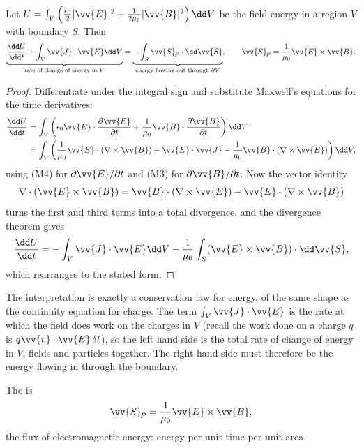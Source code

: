\begin{theorem}
	Let $U = \int_V\left(\frac{\epsilon_0}{2}|\vv{E}|^2 + \frac{1}{2\mu_0}|\vv{B}|^2\right)\dd V$ be the field energy in a region $V$ with boundary $S$. Then
	$$
	\underbrace{\frac{\dd U}{\dd t} + \int_V \vv{J}\cdot\vv{E}\dd V}_{\text{rate of change of energy in } V} = \underbrace{-\int_S \vv{S}_{\!P}\cdot\dd\vv{S}}_{\text{energy flowing out through }\partial V}, \qquad \vv{S}_{\!P} = \frac{1}{\mu_0}\vv{E}\times\vv{B}.
	$$
\end{theorem}
\begin{proof}
	Differentiate under the integral sign and substitute Maxwell's equations for the time derivatives:
	\begin{align*}
		\frac{\dd U}{\dd t} &= \int_V \left(\epsilon_0 \vv{E}\cdot\frac{\partial \vv{E}}{\partial t} + \frac{1}{\mu_0}\vv{B}\cdot\frac{\partial\vv{B}}{\partial t}\right)\dd V\\
		&= \int_V\left(\frac{1}{\mu_0}\vv{E}\cdot(\nabla\times\vv{B}) - \vv{E}\cdot\vv{J} - \frac{1}{\mu_0}\vv{B}\cdot(\nabla\times\vv{E})\right)\dd V,
	\end{align*}
	using (M4) for $\partial\vv{E}/\partial t$ and (M3) for $\partial\vv{B}/\partial t$. Now the vector identity
	$$
	\nabla\cdot(\vv{E}\times\vv{B}) = \vv{B}\cdot(\nabla\times\vv{E}) - \vv{E}\cdot(\nabla\times\vv{B})
	$$
	turns the first and third terms into a total divergence, and the divergence theorem gives
	$$
	\frac{\dd U}{\dd t} = -\int_V \vv{J}\cdot\vv{E}\dd V - \frac{1}{\mu_0}\int_S (\vv{E}\times\vv{B})\cdot\dd\vv{S},
	$$
	which rearranges to the stated form.
\end{proof}

The interpretation is exactly a conservation law for energy, of the same shape as the continuity equation for charge. The term $\int_V \vv{J}\cdot\vv{E}$ is the rate at which the field does work on the charges in $V$ (recall the work done on a charge $q$ is $q\vv{v}\cdot\vv{E}\,\delta t$), so the left hand side is the total rate of change of energy in $V$, fields and particles together. The right hand side must therefore be the energy flowing in through the boundary.

\begin{definition}
	The  is
	$$
	\vv{S}_{\!P} = \frac{1}{\mu_0}\vv{E}\times\vv{B},
	$$
	the flux of electromagnetic energy: energy per unit time per unit area.
\end{definition}

